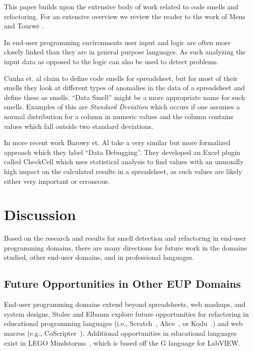 \documentclass[10pt,conference,compsocconf]{IEEEtran}
\begin{document}
This paper builds upon the extensive body of work related to code smells and refactoring. For an extensive overview we review the reader to the work of Mens and Tourw\'{e} \cite{mens2004survey}.

In end-user programming environments user input and logic are often more closely linked than they are in general purpose languages.
As such analyzing the input data as opposed to the logic can also be used to detect problems.

Cunha et. al \cite{cunha2012towards} claim to define code smells for spreadsheet, but for most of their smells they look at different types of anomalies in the data of a spreadsheet and define these as smells.
``Data Smell'' might be a more appropriate name for such smells.
Examples of this are \textit{Standard Deviation} which occurs if one assumes a normal distribution for a column in numeric values and the column contains values which fall outside two standard deviations.

In more recent work Barowy et. Al \cite{barowy2014checkcell} take a very similar but more formalized approach which they label ``Data Debugging''.
They developed an Excel plugin called CheckCell which uses statistical analysis to find values with an unusually high impact on the calculated results in a spreadsheet, as such values are likely either very important or erroneous.

\section{Discussion}
\label{sec:discussion}

Based on the research and results for smell detection and refactoring in end-user programming domains, there are many directions for future work in the domains studied, other end-user domains, and in professional languages. 

\subsection{Future Opportunities in Other EUP Domains}
End-user programming domains extend beyond spreadsheets, web mashups, and system designs. Stolee and Elbaum explore future opportunities for refactoring in educational programming languages (i.e., Scratch~\cite{scratch}, Alice~\cite{aliceIntro}, or Kodu~\cite{Stolee:2011:ECS:1953163.1953197}.) and web macros (e.g., CoScripter~\cite{coscripter}). Additional opportunities in educational languages exist in LEGO Mindstorms~\cite{lego}, which is based off the G language for LabVIEW. 
\end{document}
